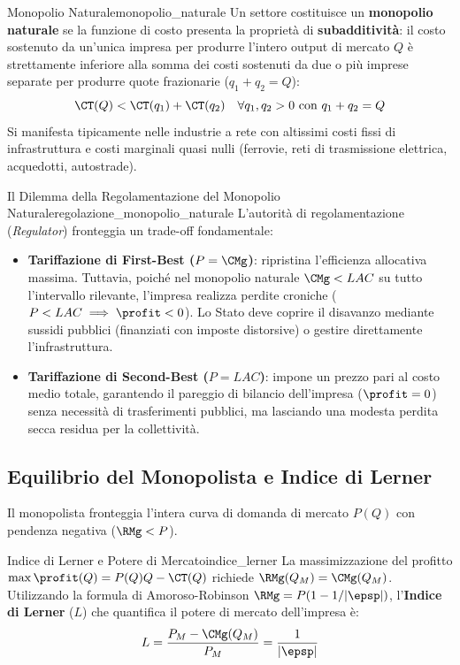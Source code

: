 \begin{definizione}{Monopolio Naturale}{monopolio_naturale}
Un settore costituisce un \textbf{monopolio naturale} se la funzione di costo presenta la proprietà di \textbf{subadditività}: il costo sostenuto da un'unica impresa per produrre l'intero output di mercato $Q$ è strettamente inferiore alla somma dei costi sostenuti da due o più imprese separate per produrre quote frazionarie ($q_1 + q_2 = Q$):
\begin{equation}
    \CT(Q) < \CT(q_1) + \CT(q_2) \quad \forall q_1, q_2 > 0 \text{ con } q_1 + q_2 = Q
\end{equation}
Si manifesta tipicamente nelle industrie a rete con altissimi costi fissi di infrastruttura e costi marginali quasi nulli (ferrovie, reti di trasmissione elettrica, acquedotti, autostrade).
\end{definizione}

\begin{modello}{Il Dilemma della Regolamentazione del Monopolio Naturale}{regolazione_monopolio_naturale}
L'autorità di regolamentazione (\textit{Regulator}) fronteggia un trade-off fondamentale:
\begin{itemize}
    \item \textbf{Tariffazione di First-Best ($P = \CMg$)}: ripristina l'efficienza allocativa massima. Tuttavia, poiché nel monopolio naturale $\CMg < LAC$ su tutto l'intervallo rilevante, l'impresa realizza perdite croniche ($P < LAC \implies \profit < 0$). Lo Stato deve coprire il disavanzo mediante sussidi pubblici (finanziati con imposte distorsive) o gestire direttamente l'infrastruttura.
    \item \textbf{Tariffazione di Second-Best ($P = LAC$)}: impone un prezzo pari al costo medio totale, garantendo il pareggio di bilancio dell'impresa ($\profit = 0$) senza necessità di trasferimenti pubblici, ma lasciando una modesta perdita secca residua per la collettività.
\end{itemize}
\end{modello}

\subsection{Equilibrio del Monopolista e Indice di Lerner}
Il monopolista fronteggia l'intera curva di domanda di mercato $P(Q)$ con pendenza negativa ($\RMg < P$).

\begin{teorema}{Indice di Lerner e Potere di Mercato}{indice_lerner}
La massimizzazione del profitto $\max \profit(Q) = P(Q)Q - \CT(Q)$ richiede $\RMg(Q_M) = \CMg(Q_M)$. Utilizzando la formula di Amoroso-Robinson $\RMg = P(1 - 1/|\epsp|)$, l'\textbf{Indice di Lerner} ($L$) che quantifica il potere di mercato dell'impresa è:
\begin{equation}
    L = \frac{P_M - \CMg(Q_M)}{P_M} = \frac{1}{|\epsp|}
    \label{eq:indice_lerner}
\end{equation}
\end{teorema}

